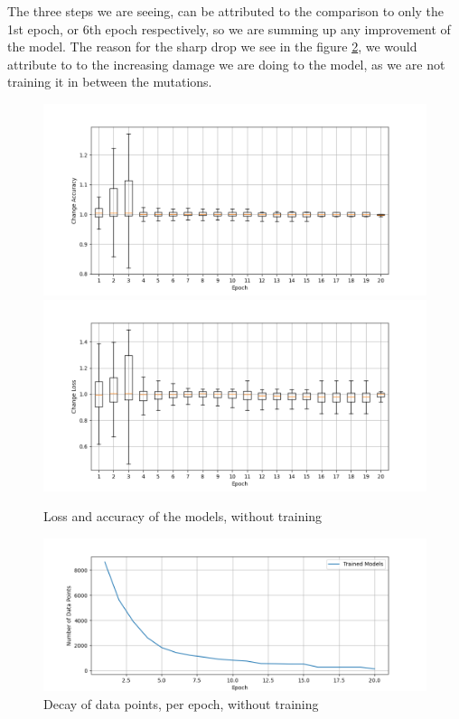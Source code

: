 The three steps we are seeing, can be attributed to the comparison to only the 1st epoch, or 6th epoch respectively, so we are summing up any improvement of the model.
The reason for the sharp drop we see in the figure \ref{fig:decay_Notraining}, we would attribute to to the increasing damage we are doing to the model, as we are not training it in between the mutations.
\begin{figure}
    \centering
    \includegraphics[width=\textwidth]{plots/NotTrained_Change_Acc.png}
    \includegraphics[width=\textwidth]{plots/NotTrained_Change_Loss.png}
    \caption{Loss and accuracy of the models, without training}
    \label{fig:loss-accuracy-Notraining}
\end{figure}
\begin{figure}
    \centering
    \includegraphics[width=\textwidth]{plots/NotTrained_Points_perEpoch.png}
    \caption{Decay of data points, per epoch, without training}
    \label{fig:decay_Notraining}
\end{figure}

